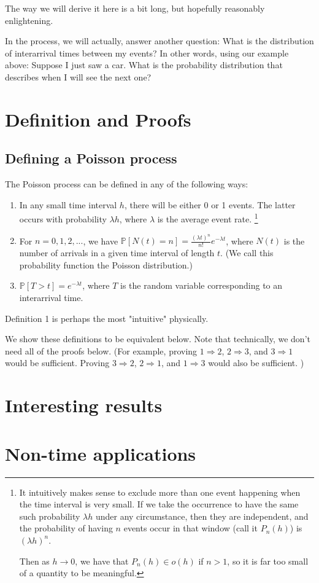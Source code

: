 \documentclass{article}
\begin{document}
The way we will derive it here is a bit long, but hopefully reasonably enlightening. 

In the process, we will actually, answer another question: What is the distribution of interarrival times between my events? In other words, using our example above: Suppose I just saw a car. What is the probability distribution that describes when I will see the next one?


\section{Definition and Proofs}

\subsection{Defining a Poisson process}

The Poisson process can be defined in any of the following ways:

\begin{enumerate}
\item In any small time interval $h$, there will be either 0 or 1 events. The latter occurs with probability $\lambda h$, where $\lambda$ is the average event rate. \footnote{It intuitively makes sense to exclude more than one event happening when the time interval is very small. If we take the occurrence to have the same such probability $\lambda h$ under any circumstance, then they are independent, and the probability of having $n$ events occur in that window (call it $P_n(h)$) is $(\lambda h)^n$. 

Then as $h \rightarrow 0$, we have that $P_n(h) \in o(h)$ if $n > 1$, so it is far too small of a quantity to be meaningful.} 
\item For $n = 0, 1, 2, ...$, we have $\mathbb{P}[N(t) = n] = \frac{(\lambda t)^n}{n!}e^{-\lambda t}$, where $N(t)$ is the number of arrivals in a given time interval of length $t$. (We call this probability function the Poisson distribution.)
\item $\mathbb{P}[T > t] = e^{-\lambda t}$, where $T$ is the random variable corresponding to an interarrival time. 
\end{enumerate}


Definition 1 is perhaps the most "intuitive" physically. 

We show these definitions to be equivalent below. Note that technically, we don't need all of the proofs below. (For example, proving $1 \Rightarrow 2$, $2 \Rightarrow 3$, and $3 \Rightarrow 1$ would be sufficient. Proving $3 \Rightarrow 2$, $2 \Rightarrow 1$, and $1 \Rightarrow 3$ would also be sufficient. ) 






\section{Interesting results}


\section{Non-time applications}
\end{document}
